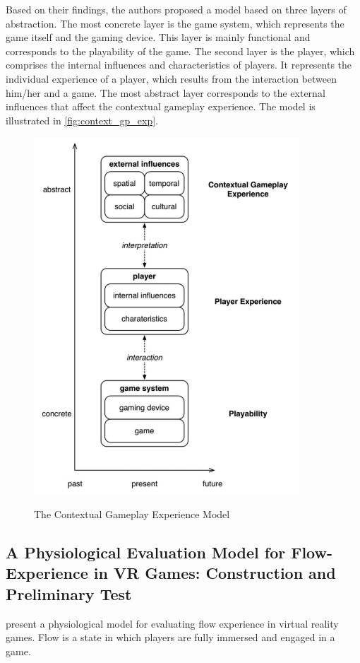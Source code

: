 Based on their findings, the authors proposed a model based on three layers of abstraction. The most concrete layer is the game system, which represents the game itself and the gaming device. This layer is mainly functional and corresponds to the playability of the game. The second layer is the player, which comprises the internal influences and characteristics of players. It represents the individual experience of a player, which results from the interaction between him/her and a game. The most abstract layer corresponds to the external influences that affect the contextual gameplay experience. The model is illustrated in \autoref{fig:context_gp_exp}.

\begin{figure}[bth]
\myfloatalign
{\includegraphics[width=.6\linewidth]{gfx/ref_framework/context_gp_exp}} \quad
\caption[The Contextual Gameplay Experience Model]{The Contextual Gameplay Experience Model \autocite{Engl2013}}\label{fig:context_gp_exp}
\end{figure}

\subsection{A Physiological Evaluation Model for Flow-Experience in VR Games: Construction and Preliminary Test}

\textcite{Bian2015} present a physiological model for evaluating flow experience in virtual reality games. Flow is a state in which players are fully immersed and engaged in a game.


